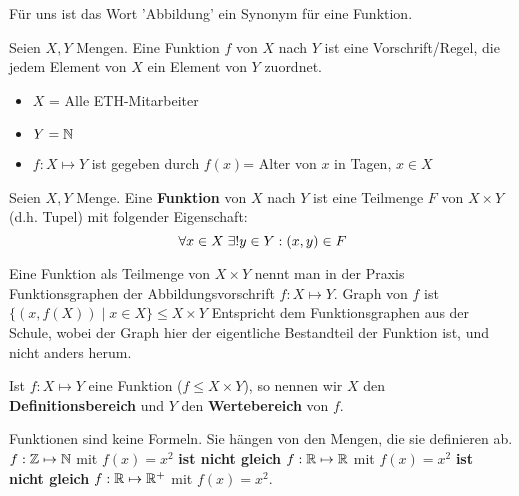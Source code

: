 \documentclass[main.tex]{subfiles}
\begin{document}
\begin{Bemerkung}
  Für uns ist das Wort 'Abbildung' ein Synonym für eine Funktion.
\end{Bemerkung}

\begin{Definition}
  Seien $X,Y$ Mengen. Eine Funktion $f$ von $X$ nach $Y$ ist eine Vorschrift/Regel, die jedem Element von $X$ ein Element von $Y$ zuordnet.
\end{Definition}

\begin{Beispiel}
  \begin{itemize}
    \item $X$ = Alle ETH-Mitarbeiter
    \item $Y = \mathbb{N} $
    \item $f: X \mapsto Y$ ist gegeben durch $f(x)$= Alter von $x$ in Tagen, $x \in X$
  \end{itemize}
\end{Beispiel}

\begin{Definition}[Funktion]
  Seien $X,Y$ Menge. Eine \textbf{Funktion} von $X$ nach $Y$ ist eine Teilmenge $F$ von $X \times Y$ (d.h. Tupel) mit folgender Eigenschaft:
  $$\;\forall x\in X \;\exists ! y \in Y : (x,y) \in F$$
\end{Definition}

\begin{Bemerkung}
  Eine Funktion als Teilmenge von $X \times Y$ nennt man in der Praxis Funktionsgraphen der Abbildungsvorschrift $f: X \mapsto Y$. Graph von $f$ ist $\{ (x,f(X)) \mid x \in X \} \leq X \times Y $
  Entspricht dem Funktionsgraphen aus der Schule, wobei der Graph hier der eigentliche Bestandteil der Funktion ist, und nicht anders herum.
\end{Bemerkung}

\begin{Definition}
  Ist $f : X \mapsto Y $ eine Funktion ($f \leq X \times Y$), so nennen wir $X$ den \textbf{Definitionsbereich} und $Y$ den \textbf{Wertebereich} von $f$.
\end{Definition}
\begin{Bemerkung}
  Funktionen sind keine Formeln. Sie hängen von den Mengen, die sie definieren ab. $f: \mathbb{Z} \mapsto \mathbb{N} $ mit $f(x)=x^2$ \textbf{ist nicht gleich} $f: \mathbb{R} \mapsto \mathbb{R} $ mit $f(x)=x^2$ \textbf{ist nicht gleich} $f: \mathbb{R} \mapsto \mathbb{R}^+ $ mit $f(x)=x^2$.
\end{Bemerkung}
\end{document}
